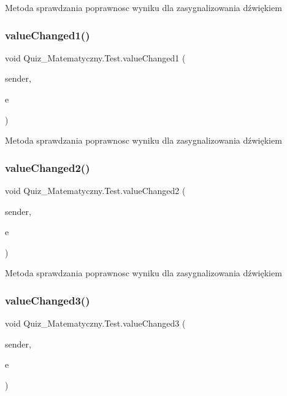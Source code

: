 Metoda sprawdzania poprawnosc wyniku dla zasygnalizowania dźwiękiem \mbox{\label{class_quiz___matematyczny_1_1_test_a414bd7e3fd06bc3cdba49d2bb0a03457}} 
\subsubsection{\texorpdfstring{valueChanged1()}{valueChanged1()}}
{\footnotesize\ttfamily void Quiz\+\_\+\+Matematyczny.\+Test.\+value\+Changed1 (\begin{DoxyParamCaption}\item[{object}]{sender,  }\item[{Event\+Args}]{e }\end{DoxyParamCaption})\hspace{0.3cm}{\ttfamily [private]}}

Metoda sprawdzania poprawnosc wyniku dla zasygnalizowania dźwiękiem \mbox{\label{class_quiz___matematyczny_1_1_test_af4858e74b30383ca7a95f7a292c76148}} 
\subsubsection{\texorpdfstring{valueChanged2()}{valueChanged2()}}
{\footnotesize\ttfamily void Quiz\+\_\+\+Matematyczny.\+Test.\+value\+Changed2 (\begin{DoxyParamCaption}\item[{object}]{sender,  }\item[{Event\+Args}]{e }\end{DoxyParamCaption})\hspace{0.3cm}{\ttfamily [private]}}

Metoda sprawdzania poprawnosc wyniku dla zasygnalizowania dźwiękiem \mbox{\label{class_quiz___matematyczny_1_1_test_a1ac3d8e7537eb39f68192c9bd8c7b9d4}} 
\subsubsection{\texorpdfstring{valueChanged3()}{valueChanged3()}}
{\footnotesize\ttfamily void Quiz\+\_\+\+Matematyczny.\+Test.\+value\+Changed3 (\begin{DoxyParamCaption}\item[{object}]{sender,  }\item[{Event\+Args}]{e }\end{DoxyParamCaption})\hspace{0.3cm}{\ttfamily [private]}}

